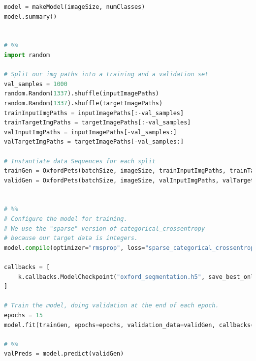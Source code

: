 \begin{lstlisting}[language=python]
model = makeModel(imageSize, numClasses)
model.summary()


# %%
import random

# Split our img paths into a training and a validation set
val_samples = 1000
random.Random(1337).shuffle(inputImagePaths)
random.Random(1337).shuffle(targetImagePaths)
trainInputImgPaths = inputImagePaths[:-val_samples]
trainTargetImgPaths = targetImagePaths[:-val_samples]
valInputImgPaths = inputImagePaths[-val_samples:]
valTargetImgPaths = targetImagePaths[-val_samples:]

# Instantiate data Sequences for each split
trainGen = OxfordPets(batchSize, imageSize, trainInputImgPaths, trainTargetImgPaths)
validGen = OxfordPets(batchSize, imageSize, valInputImgPaths, valTargetImgPaths)


# %%
# Configure the model for training.
# We use the "sparse" version of categorical_crossentropy
# because our target data is integers.
model.compile(optimizer="rmsprop", loss="sparse_categorical_crossentropy")

callbacks = [
    k.callbacks.ModelCheckpoint("oxford_segmentation.h5", save_best_only=True)
]

# Train the model, doing validation at the end of each epoch.
epochs = 15
model.fit(trainGen, epochs=epochs, validation_data=validGen, callbacks=callbacks)

# %%
valPreds = model.predict(validGen)

\end{lstlisting}

